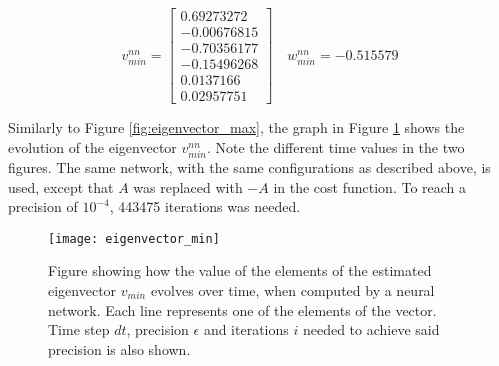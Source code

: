 \begin{equation*}
  v_{min}^{nn} = \begin{bmatrix}
   0.69273272 \\
   -0.00676815 \\
   -0.70356177 \\
   -0.15496268  \\
   0.0137166   \\
   0.02957751
  \end{bmatrix} \quad w_{min}^{nn} =  -0.515579
\end{equation*}

Similarly to Figure \ref{fig:eigenvector_max}, the graph in Figure \ref{fig:eigenvector_min} shows the evolution of the eigenvector $v_{min}^{nn}$. Note the different time values in the two figures. The same network, with the same configurations as described above, is used, except that $A$ was replaced with $-A$ in the cost function. To reach a precision of $10^{-4}$, 443475 iterations was needed.

\begin{figure}[htbp]
 \centering
 \texttt{[image: eigenvector\_min]}
 \caption{Figure showing how the value of the elements of the estimated eigenvector $v_{min}$ evolves over time, when computed by a neural network. Each line represents one of the elements of the vector. Time step $dt$, precision $\epsilon$ and iterations $i$ needed to achieve said precision is also shown.}
 \label{fig:eigenvector_min}
\end{figure}

